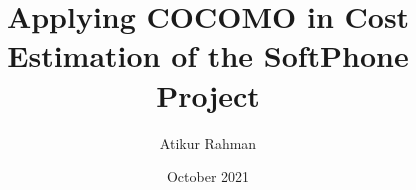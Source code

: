 \newcommand*{\ARCTHIRDCOPY}{}
\newcommand{\thesistitle}{Applying COCOMO in Cost Estimation of the SoftPhone Project}
\newcommand{\myname}{Atikur Rahman}
\newcommand{\mystdid}{16701016}
\newcommand{\mysession}{2019\textendash 2020}
\newcommand{\mydegree}{Master of Science in Engineering}
\newcommand{\mydate}{October 2021}
\newcommand{\supervisorname}{Dr. Mohammad Osiur Rahman}
\newcommand{\supdesignation}{Professor}
\newcommand{\deptname}{Computer Science and Engineering}
\newcommand{\institutename}{University of Chittagong}

\usepackage[a-2u]{pdfx}
\usepackage{graphicx}
\usepackage[bindingoffset=1cm]{geometry}
\usepackage{floatrow}

\usepackage{pgfplots}
\pgfplotsset{compat=1.16}
\usepackage{minted}
\usepackage{titlesec}
\usepackage[toc,acronym]{glossaries}
\makenoidxglossaries
\linespread{1.3}
\hypersetup{
    bookmarksnumbered=true,
    allbordercolors=white,
    citebordercolor=green
}

\newenvironment{chapters}{
    \clearpage
    \pagenumbering{arabic}
    \titleformat{\chapter}[display]{\bfseries\LARGE}
    {\filleft\MakeUppercase{Chapter \thechapter}}
    {0pt}{
        \titlerule[2pt]
        \vspace{2pt}
        \titlerule
        \vspace{2mm}
    }[
        \vspace{2mm}
        \titlerule
    ]
}{}


\newenvironment{appendices}{
    \linespread{1}
    \titleformat{\chapter}[display]{\bfseries\LARGE}
    {\filright\MakeUppercase{APPENDIX \thechapter}}
    {0pt}{
        \titlerule[2pt]
        \vspace{2pt}
        \titlerule
        \filleft
        \vspace{2mm}
    }[
        \vspace{2mm}
        \titlerule
    ]
    \appendix
}{}

\title{\thesistitle}
\author{\myname}
\date{\mydate}

\graphicspath{{images/}}
